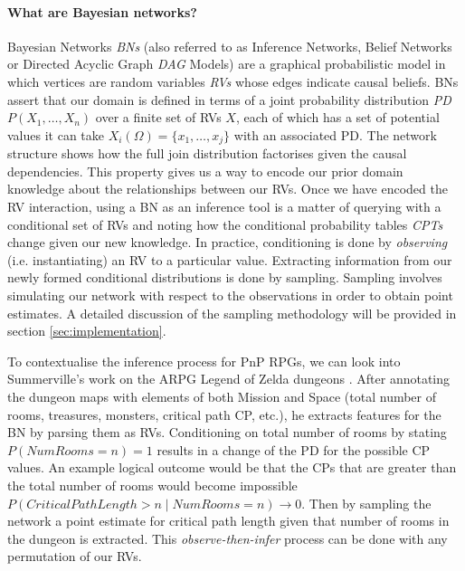 \documentclass{UoYCSproject}
\begin{document}
\paragraph{What are Bayesian networks?}
Bayesian Networks \textit{BNs} \parencite{pearl1985bayesian} (also referred to as Inference Networks, Belief Networks or Directed Acyclic Graph \textit{DAG} Models) are a graphical probabilistic model in which vertices are random variables \textit{RVs} whose edges indicate causal beliefs. BNs assert that our domain is defined in terms of a joint probability distribution \textit{PD} \(P(X_1, \ldots , X_n)\) over a finite set of RVs \(X\), each of which has a set of potential values it can take \(X_i(\Omega) = \{x_1, \ldots, x_j\}\) with an associated PD. The network structure shows how the full join distribution factorises given the causal dependencies. This property gives us a way to encode our prior domain knowledge about the relationships between our RVs.
Once we have encoded the RV interaction, using a BN as an inference tool is a matter of querying with a conditional set of RVs and noting how the conditional probability tables \textit{CPTs} change given our new knowledge. In practice, conditioning is done by \textit{observing} (i.e. instantiating) an RV to a particular value. Extracting information from our newly formed conditional distributions is done by sampling. Sampling involves simulating our network with respect to the observations in order to obtain point estimates. A detailed discussion of the sampling methodology will be provided in section \ref{sec:implementation}.

To contextualise the inference process for PnP RPGs, we can look into Summerville's work on the ARPG Legend of Zelda dungeons \parencite{SummervilleLearningOfZelda}. After annotating the dungeon maps with elements of both Mission and Space (total number of rooms, treasures, monsters, critical path CP, etc.), he extracts features for the BN by parsing them as RVs. Conditioning on total number of rooms by stating \(P(NumRooms = n) = 1\) results in a change of the PD for the possible CP values. An example logical outcome would be that the CPs that are greater than the total number of rooms would become impossible \(P(CriticalPathLength > n \mid NumRooms = n) \rightarrow 0 \). Then by sampling the network a point estimate for critical path length given that number of rooms in the dungeon is extracted. This \textit{observe-then-infer} process can be done with any permutation of our RVs.
\end{document}
